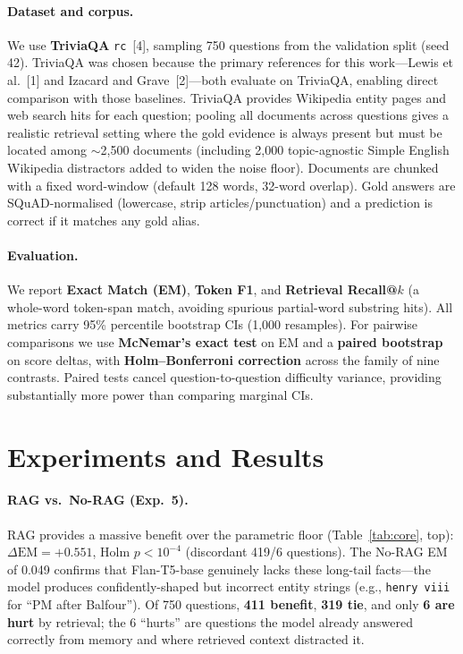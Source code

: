 \documentclass{article}
\begin{document}
\paragraph{Dataset and corpus.}
We use \textbf{TriviaQA} \texttt{rc}~[4], sampling 750 questions from
the validation split (seed 42).
TriviaQA was chosen because the primary references for this work---Lewis
et al.~[1] and Izacard and Grave~[2]---both evaluate on TriviaQA,
enabling direct comparison with those baselines.
TriviaQA provides Wikipedia entity pages and web search hits for each
question; pooling all documents across questions gives a realistic
retrieval setting where the gold evidence is always present but must
be located among $\sim$2{,}500 documents (including 2{,}000
topic-agnostic Simple English Wikipedia distractors added to widen the
noise floor).
Documents are chunked with a fixed word-window (default 128 words,
32-word overlap).
Gold answers are SQuAD-normalised (lowercase, strip articles/punctuation)
and a prediction is correct if it matches any gold alias.

\paragraph{Evaluation.}
We report \textbf{Exact Match (EM)}, \textbf{Token F1}, and
\textbf{Retrieval Recall@$k$} (a whole-word token-span match, avoiding
spurious partial-word substring hits).
All metrics carry 95\% percentile bootstrap CIs (1{,}000 resamples).
For pairwise comparisons we use \textbf{McNemar's exact test} on EM and
a \textbf{paired bootstrap} on score deltas, with
\textbf{Holm--Bonferroni correction} across the family of nine contrasts.
Paired tests cancel question-to-question difficulty variance, providing
substantially more power than comparing marginal CIs.

\section{Experiments and Results}

\paragraph{RAG vs.\ No-RAG (Exp.\ 5).}
RAG provides a massive benefit over the parametric floor
(Table~\ref{tab:core}, top):
$\Delta\mathrm{EM}\!=\!{+0.551}$, Holm $p\!<\!10^{-4}$ (discordant
419/6 questions).
The No-RAG EM of 0.049 confirms that Flan-T5-base genuinely lacks these
long-tail facts---the model produces confidently-shaped but incorrect
entity strings (e.g., \texttt{henry viii} for ``PM after Balfour'').
Of 750 questions, \textbf{411 benefit}, \textbf{319 tie}, and only
\textbf{6 are hurt} by retrieval; the 6 ``hurts'' are questions the
model already answered correctly from memory and where retrieved context
distracted it.
\end{document}
